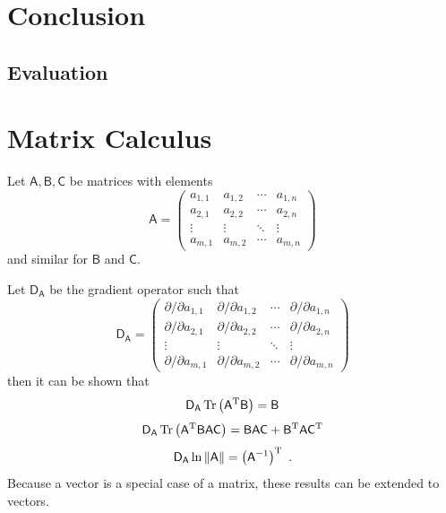 \documentclass[12pt]{report}
\DeclareMathOperator{\trace}{Tr}
\newcommand{\T}{^\textup{T}}
\newcommand{\matr}[1]{\mathsf{#1}}
\begin{document}
\chapter{Conclusion}
\section{Evaluation}

\appendix

\chapter{Matrix Calculus}\label{chapter:matrixCalculus}
Let $\matr{A},\matr{B},\matr{C}$ be matrices with elements
\begin{equation*}
\matr{A}=
\begin{pmatrix}
a_{1,1}&a_{1,2}&\cdots&a_{1,n} \\
a_{2,1}&a_{2,2}&\cdots&a_{2,n} \\
\vdots&\vdots&\ddots&\vdots \\
a_{m,1}&a_{m,2}&\cdots&a_{m,n} 
\end{pmatrix}
\end{equation*}
and similar for $\matr{B}$ and $\matr{C}$.

Let $\matr{D_{A}}$ be the gradient operator such that
\begin{equation*}
\matr{D_{A}}=
\begin{pmatrix}
\partial/\partial a_{1,1}&\partial/\partial a_{1,2}&\cdots&\partial/\partial a_{1,n} \\
\partial/\partial a_{2,1}&\partial/\partial a_{2,2}&\cdots&\partial/\partial a_{2,n} \\
\vdots&\vdots&\ddots&\vdots \\
\partial/\partial a_{m,1}&\partial/\partial a_{m,2}&\cdots&\partial/\partial a_{m,n} 
\end{pmatrix}
\end{equation*}
then it can be shown that \cite{petersen2008matrix}
\begin{equation}
\matr{D_{A}}\trace\left(\matr{A}\T\matr{B}\right) = \matr{B}
\end{equation}
\begin{equation}
\matr{D_{A}}\trace\left(\matr{A}\T\matr{B}\matr{A}\matr{C}\right) = \matr{B}\matr{A}\matr{C}+\matr{B}\T\matr{A}\matr{C}\T
\end{equation}
\begin{equation}
\matr{D_{A}}\ln\left\|\matr{A}\right\| = \left(\matr{A}^{-1}\right)\T \ .
\end{equation}
Because a vector is a special case of a matrix, these results can be extended to vectors.
\end{document}
